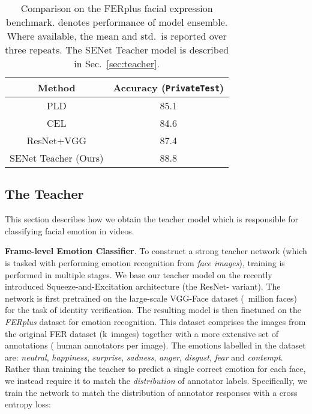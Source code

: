 \documentclass[sigconf]{acmart}
\begin{document}
\begin{table}
\setlength{\tabcolsep}{0.7em} \centering
\begin{tabular}{cc}
\multicolumn{1}{c}{Method} & \multicolumn{1}{c}{Accuracy (\texttt{PrivateTest})} \\   \toprule         
PLD \cite{BarsoumICMI2016} & 85.1  \\
CEL \cite{BarsoumICMI2016} & 84.6  \\
ResNet+VGG \cite{huang2017combining} & 87.4 \\
\hline
SENet Teacher (Ours) & 88.8   \\


\end{tabular}
\normalsize
\vspace{5pt}
\caption{Comparison on the FERplus facial expression benchmark.   denotes performance of model ensemble.  Where available, the mean and std.\  is reported over three repeats. The 
SENet Teacher model is described in  Sec.~\ref{sec:teacher}.}
\label{tab:FERplus}
\end{table} 
\subsection{The Teacher\label{sec:teacher}}

This section describes how we obtain the teacher model which is responsible for classifying facial emotion in videos.

\noindent \textbf{Frame-level Emotion Classifier}. To construct a strong teacher network (which is tasked with performing emotion recognition from \textit{face images}), training is performed in multiple stages. We base our teacher model on the recently introduced Squeeze-and-Excitation architecture \cite{Hu18} (the ResNet- variant).  The network is first pretrained on the large-scale VGG-Face dataset \cite{Cao18} (~million faces) for the task of identity verification.  The resulting model is then finetuned on the \textit{FERplus} dataset \cite{BarsoumICMI2016} for emotion recognition. This dataset comprises the images from the original FER dataset (k~images) \cite{goodfellow2013challenges} together with a more extensive set of annotations ( human annotators per image).  The emotions labelled in the dataset are: \textit{neutral}, \textit{happiness}, \textit{surprise}, \textit{sadness}, \textit{anger}, \textit{disgust}, \textit{fear} and \textit{contempt}.  Rather than training the teacher to predict a single correct emotion for each face, we instead require it to match the \textit{distribution} of annotator labels. Specifically, we train the network to match the distribution of annotator responses with a cross entropy loss:
\end{document}
